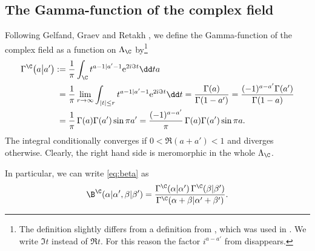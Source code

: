 \subsection{The Gamma-function of the complex field}\label{ss:Gamma}
Following Gelfand, Graev and Retakh \cite{GGR},
we define the Gamma-function of the complex field as
a function on $\Lambda_\C$ by\footnote{The definition slightly
differs from a definition from \cite{GGR}, which was used in
\cite{MN,Ner-doug}. We write $\Im t$ instead of $\Re t$. For this reason
the factor $i^{a-a'}$ from \cite{GGR,MN} disappears.}
\begin{align}
\Gamma^\C\big(a\big|a'\big)&:=
\frac 1\pi \int_\C t^{a-1|a'-1} {\rm e}^{2{\rm i} \Im t}\dd ta \notag\\
&\hphantom{:}=
\frac{1}{\pi} \lim_{r\to\infty} \int_{|t|\le r} t^{a-1|a'-1}
{\rm e}^{2{\rm i} \Im t}\dd t
= \frac{\Gamma(a)}{\Gamma(1-a')}
=\frac{(-1)^{a-a'}\Gamma(a')}{\Gamma(1-a)} \notag \\
&\hphantom{:}= \frac{1}{\pi}\,
\Gamma(a)\Gamma(a')\sin\pi a'
= \frac{(-1)^{a-a'}}{\pi} \,\Gamma(a)\Gamma(a')\sin\pi a. \label{eq:Gamma}
\end{align}
The integral conditionally converges if $0<\Re(a+a')<1$
and diverges otherwise. Clearly, the right hand side is meromorphic
in the whole $\Lambda_\C$.

\begin{Remark} In particular, we can write \eqref{eq:beta} as
\[
\B^\C(\alpha|\alpha',\beta|\beta')=
\frac{\Gamma^\C(\alpha|\alpha')\,\Gamma^\C(\beta|\beta')}
{\Gamma^\C(\alpha+\beta|\alpha'+\beta')}.
\]
\end{Remark}

